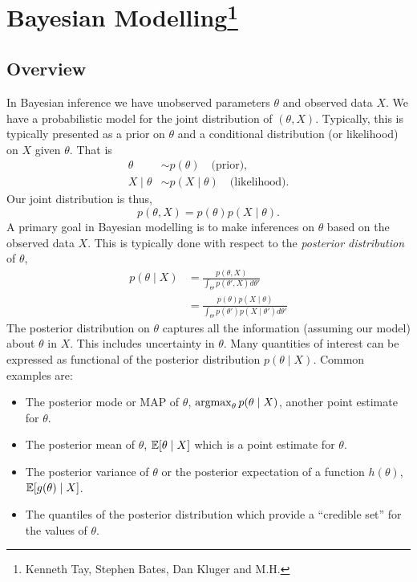\section{Bayesian Modelling\footnote{Kenneth Tay, Stephen Bates, Dan Kluger and M.H.}}

\subsection{Overview}

In Bayesian inference we have unobserved parameters $\theta$ and observed data $X$. We have a probabilistic model for the joint distribution of $(\theta,X)$. Typically, this is typically presented as a prior on $\theta$ and a conditional distribution (or likelihood) on $X$ given $\theta$. That is
\begin{align*}
    \theta &\sim p(\theta) \quad \text{(prior)},\\
    X \mid \theta &\sim p(X\mid \theta) \quad \text{(likelihood)}.
\end{align*}
Our joint distribution is thus,
\[p(\theta,X) = p(\theta)p(X \mid \theta). \]
A primary goal in Bayesian modelling is to make inferences on $\theta$ based on the observed data $X$. This is typically done with respect to the \emph{posterior distribution} of $\theta$,
\begin{align*}
    p(\theta \mid X) &=\frac{p(\theta,X)}{\int_\Theta p(\theta',X)d\theta'}\\
    &=\frac{p(\theta)p(X \mid \theta)}{\int_\Theta p(\theta')p(X \mid \theta')d\theta'}
\end{align*}
The posterior distribution on $\theta$ captures all the information (assuming our model) about $\theta$ in $X$. This includes uncertainty in $\theta$. Many quantities of interest can be expressed as functional of the posterior distribution $p(\theta \mid X)$. Common examples are:
\begin{itemize}
    \item The posterior mode or MAP of $\theta$, $\operatorname*{argmax}_\theta p(\theta \mid X)$, another point estimate for $\theta$.
    \item The posterior mean of $\theta$, ${\mathbb E}[\theta \mid X]$ which is a point estimate for $\theta$.
    \item The posterior variance of $\theta$ or the posterior expectation of a function $h(\theta)$, ${\mathbb E}[g(\theta)\mid X]$.
    \item The quantiles of the posterior distribution which provide a ``credible set'' for the values of $\theta$.
\end{itemize}

